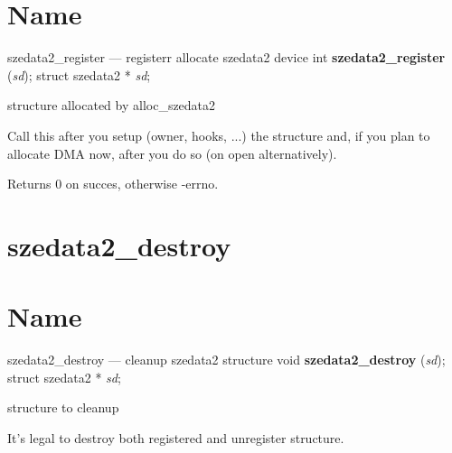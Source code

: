 \section*{Name}
szedata2\_register --- registerr allocate szedata2 device\label{id245658}
\label{id245664}int \textbf{ szedata2\_register } ({\ttfamily\itshape{{sd}}});
	\newline
	struct szedata2 * {\ttfamily\itshape{{sd}}};
\label{id245684}

\begin{kdocdescription}
\item[{{\ttfamily\itshape{{sd}}}}]
structure allocated by alloc\_szedata2
\end{kdocdescription}
\noindent 
{}
\label{id245709}

Call this after you setup (owner, hooks, ...) the structure and, if you plan to allocate DMA now, after you do so (on open alternatively).

Returns 0 on succes, otherwise -errno.
% 
\section*{szedata2\_destroy}
\label{API-szedata2-destroy}\hypertarget{API-szedata2-destroy}{}%
\label{id245758}

\section*{Name}
szedata2\_destroy --- cleanup szedata2 structure\label{id245768}
\label{id245773}void \textbf{ szedata2\_destroy } ({\ttfamily\itshape{{sd}}});
	\newline
	struct szedata2 * {\ttfamily\itshape{{sd}}};
\label{id245793}

\begin{kdocdescription}
\item[{{\ttfamily\itshape{{sd}}}}]
structure to cleanup
\end{kdocdescription}
\noindent 
{}
\label{id245818}

It's legal to destroy both registered and unregister structure.


